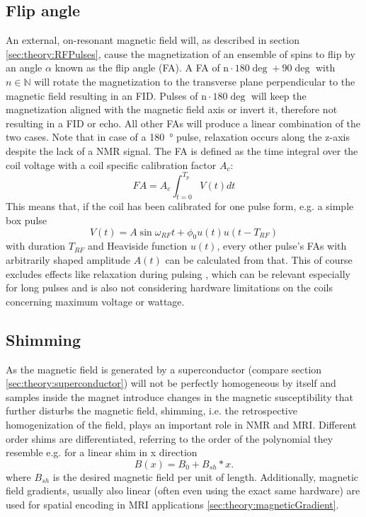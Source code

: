         \subsection{Flip angle}
        An external, on-resonant magnetic field will, as described in section \ref{sec:theory:RFPulses}, cause the magnetization of an ensemble of spins to flip by an angle $\alpha$ known as the flip angle (FA). A FA of $\mathrm n\cdot 180 \deg + 90 \deg$ with $n \in \mathbb{N}$ will rotate the magnetization to the transverse plane perpendicular to the magnetic field resulting in an FID. Pulses of $\mathrm n\cdot 180 \deg$ will keep the magnetization aligned with the magnetic field axis or invert it, therefore not resulting in a FID or echo. All other FAs will produce a linear combination of the two cases. Note that in case of a \SI{180}{\degree} pulse, relaxation occurs along the z-axis despite the lack of a NMR signal. The FA is defined as the time integral over the coil voltage with a coil specific calibration factor $A_c$:
            \begin{equation}
                FA = A_c \int_{t=0}^{T_p}{V(t)dt}
            \end{equation}
            This means that, if the coil has been calibrated for one pulse form, e.g. a simple box pulse 
            \begin{equation}
                V(t) = A\sin{\omega_{RF} t + \phi_0} u(t)u(t-T_{RF})
            \end{equation}
            with duration $T_{RF}$ and Heaviside function $u(t)$, every other pulse's FAs with arbitrarily shaped amplitude $A(t)$ can be calculated from that. This of course excludes effects like relaxation during pulsing \cite{wang_factors_2006}, which can be relevant especially for long pulses and is also not considering hardware limitations on the coils concerning maximum voltage or wattage.
        \subsection{Shimming}
        As the magnetic field is generated by a superconductor (compare section \ref{sec:theory:superconductor}) will not be perfectly homogeneous by itself and samples inside the magnet introduce changes in the magnetic susceptibility that further disturbs the magnetic field, shimming, i.e. the retrospective homogenization of the field, plays an important role in NMR and MRI. Different order shims are differentiated, referring to the order of the polynomial they resemble e.g. for a linear shim in x direction
            \begin{equation}
                B(x) = B_0 + B_{sh} * x.
            \end{equation}
            where $B_{sh}$ is the desired magnetic field per unit of length.
            Additionally, magnetic field gradients, usually also linear (often even using the exact same hardware) are used for spatial encoding in MRI applications \ref{sec:theory:magneticGradient}.
